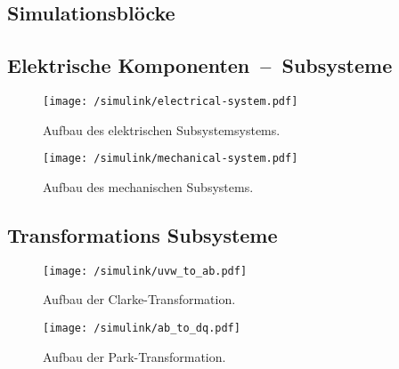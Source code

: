 
\cleardoublepage




\listoffigures
\cleardoublepage
\nocite{*}
\printbibliography
\begin{appendix}
\chapter{Simulationsblöcke}
\section{Elektrische Komponenten~--~Subsysteme}
\begin{figure}[htb]
	\centering
	\texttt{[image: /simulink/electrical-system.pdf]}
	\label{fig:electrical-system}
	\caption{Aufbau des elektrischen Subsystemsystems.}
\end{figure}

\begin{figure}[htb]
\centering
\texttt{[image: /simulink/mechanical-system.pdf]}
\label{fig:mechanical-system}
\caption{Aufbau des mechanischen Subsystems.}
\end{figure}
\newpage
\section{Transformations Subsysteme}
\begin{figure}[h]
	\centering
	\texttt{[image: /simulink/uvw\_to\_ab.pdf]}
	\label{fig:uvw_to_ab}
	\caption{Aufbau der Clarke-Transformation.}
\end{figure}

\begin{figure}[h]
	\centering
	\texttt{[image: /simulink/ab\_to\_dq.pdf]}
	\label{fig:uvw_to_ab}
	\caption{Aufbau der Park-Transformation.}
\end{figure}


	
\end{appendix}

